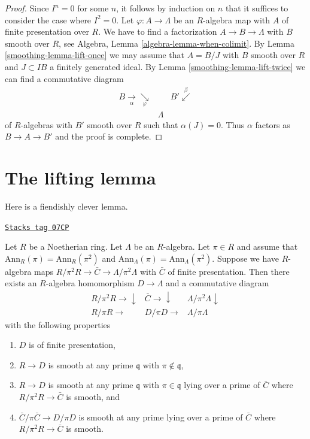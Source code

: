 \begin{proof}

Since $I^n = 0$ for some $n$, it follows by induction on $n$ that
it suffices to consider the case where $I^2 = 0$. Let
$\varphi : A \to \Lambda$ be an $R$-algebra map with $A$ of finite
presentation over $R$. We have to find a factorization $A \to B \to \Lambda$
with $B$ smooth over $R$, see Algebra, Lemma \ref{algebra-lemma-when-colimit}.
By Lemma \ref{smoothing-lemma-lift-once} we may assume that
$A = B/J$ with $B$ smooth over $R$ and $J \subset IB$
a finitely generated ideal. By
Lemma \ref{smoothing-lemma-lift-twice}
we can find a commutative diagram
$$
\begin{array}{ccc}B \underset{\alpha}{\longrightarrow}\underset{\varphi}{\searrow} &  & B' \overset{\beta}{\swarrow} \\  & \Lambda & \end{array}
$$
of $R$-algebras with $B'$ smooth over $R$ such that $\alpha(J) = 0$.
Thus $\alpha$ factors as $B \to A \to B'$ and the proof is complete.
\end{proof}

\section{The lifting lemma}
\label{smoothing-section-lifting-lemma}
Here is a fiendishly clever lemma.

\begin{lemma}[Lifting]
\label{smoothing-lemma-lifting}
\href{https://stacks.math.columbia.edu/tag/07CP}{\texttt{Stacks tag 07CP}}

Let $R$ be a Noetherian ring. Let $\Lambda$ be an $R$-algebra.
Let $\pi \in R$ and assume that $\text{Ann}_R(\pi) = \text{Ann}_R(\pi^2)$ and
$\text{Ann}_\Lambda(\pi) = \text{Ann}_\Lambda(\pi^2)$.
Suppose we have $R$-algebra maps
$R/\pi^2R \to \bar C \to \Lambda/\pi^2\Lambda$
with $\bar C$ of finite presentation.
Then there exists an $R$-algebra homomorphism
$D \to \Lambda$ and a commutative diagram
$$
\begin{array}{ccc}R/\pi^2R \longrightarrow\downarrow & \bar C \longrightarrow\downarrow & \Lambda/\pi^2\Lambda \downarrow \\ R/\pi R \longrightarrow & D/\pi D \longrightarrow & \Lambda/\pi \Lambda\end{array}
$$
with the following properties
\begin{enumerate}
\item[(a)] $D$ is of finite presentation,
\item[(b)] $R \to D$ is smooth at any prime $\mathfrak q$ with
$\pi \not \in \mathfrak q$,
\item[(c)] $R \to D$ is smooth at any prime $\mathfrak q$ with
$\pi \in \mathfrak q$ lying over a prime of $\bar C$ where
$R/\pi^2 R \to \bar C$ is smooth, and
\item[(d)] $\bar C/\pi \bar C \to D/\pi D$ is smooth at any prime
lying over a prime of $\bar C$ where $R/\pi^2R \to \bar C$ is smooth.
\end{enumerate}
\end{lemma}

